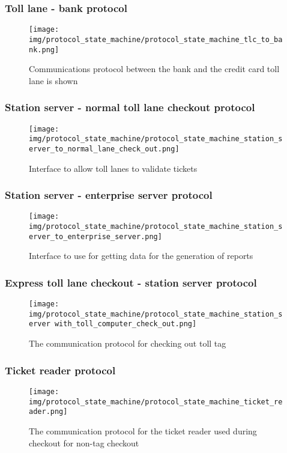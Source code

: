 \subsubsection*{Toll lane - bank protocol}
\begin{figure}
\centering
\texttt{[image: img/protocol\_state\_machine/protocol\_state\_machine\_tlc\_to\_bank.png]}
\caption{Communications protocol between the bank and the credit card toll lane is shown}
\label{fig:protocol_state_machine_tlc_to_bank}
\end{figure}

\subsubsection*{Station server - normal toll lane checkout protocol}
\begin{figure}
\centering
\texttt{[image: img/protocol\_state\_machine/protocol\_state\_machine\_station\_server\_to\_normal\_lane\_check\_out.png]}
\caption{Interface to allow toll lanes to validate tickets}
\label{fig:protocol_state_machine_station_server_to_normal_lane_check_out}
\end{figure}

\subsubsection*{Station server - enterprise server protocol}
\begin{figure}
\centering
\texttt{[image: img/protocol\_state\_machine/protocol\_state\_machine\_station\_server\_to\_enterprise\_server.png]}
\caption{Interface to use for getting data for the generation of reports}
\label{fig:protocol_state_machine_station_server_to_enterprise_server}
\end{figure}

\subsubsection*{Express toll lane checkout - station server protocol}
\begin{figure}
\centering
\texttt{[image: img/protocol\_state\_machine/protocol\_state\_machine\_station\_server with\_toll\_computer\_check\_out.png]}
\caption{The communication protocol for checking out toll tag}
\label{fig:protocol_state_machine_station_server with_toll_computer_check_out}
\end{figure}

\subsubsection*{Ticket reader protocol}
\begin{figure}
\centering
\texttt{[image: img/protocol\_state\_machine/protocol\_state\_machine\_ticket\_reader.png]}
\caption{The communication protocol for the ticket reader used during checkout for non-tag checkout}
\label{fig:protocol_state_machine_ticket_reader}
\end{figure}

